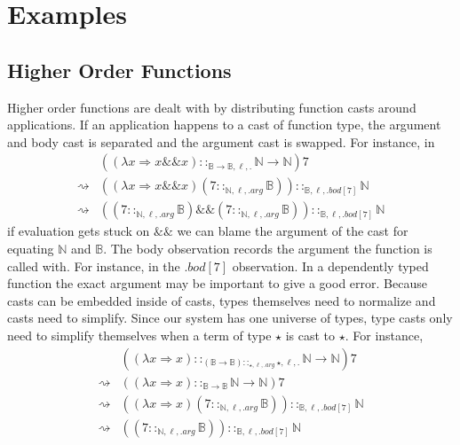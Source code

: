 
\section{Examples}

\subsection{Higher Order Functions}

Higher order functions are dealt with by distributing function casts around applications.
If an application happens to a cast of function type, the argument and body cast is separated and the argument cast is swapped.
For instance, in 
\begin{align*}
\, & \left(\left(\lambda x\Rightarrow x\&\&x\right)::_{\mathbb{B}\rightarrow\mathbb{B},\ell,.}\mathbb{N}\rightarrow\mathbb{N}\right)7\\
\rightsquigarrow & \left(\left(\lambda x\Rightarrow x\&\&x\right)\left(7::_{\mathbb{N},\ell,.arg}\mathbb{B}\right)\right)::_{\mathbb{B},\ell,.bod[7]}\mathbb{N}\\
\rightsquigarrow & \left(\left(7::_{\mathbb{N},\ell,.arg}\mathbb{B}\right)\&\&\left(7::_{\mathbb{N},\ell,.arg}\mathbb{B}\right)\right) ::_{\mathbb{B},\ell,.bod[7]}\mathbb{N}
\end{align*}
if evaluation gets stuck on $\&\&$ we can blame the argument of the cast for equating $\mathbb{N}$ and $\mathbb{B}$.
The body observation records the argument the function is called with.
For instance, in the $.bod[7]$ observation.
In a dependently typed function the exact argument may be important to give a good error.
Because casts can be embedded inside of casts, types themselves need to normalize and casts need to simplify.
Since our system has one universe of types, type casts only need to simplify themselves when a term of type $\star$ is cast to $\star$.
For instance, 
\begin{align*}
\, & \left(\left(\lambda x\Rightarrow x\right)::_{\left(\mathbb{B}\rightarrow\mathbb{B}\right)::_{\star,\ell,.arg}\star,\ell,.}\mathbb{N}\rightarrow\mathbb{N}\right)7\\
\rightsquigarrow & \left(\left(\lambda x\Rightarrow x\right)::_{\mathbb{B}\rightarrow\mathbb{B}}\mathbb{N}\rightarrow\mathbb{N}\right)7\\
\rightsquigarrow & \left(\left(\lambda x\Rightarrow x\right)\left(7::_{\mathbb{N},\ell,.arg}\mathbb{B}\right)\right)::_{\mathbb{B},\ell,.bod[7]}\mathbb{N}\\
\rightsquigarrow & \left(\left(7::_{\mathbb{N},\ell,.arg}\mathbb{B}\right)\right)::_{\mathbb{B},\ell,.bod[7]}\mathbb{N}
\end{align*}

